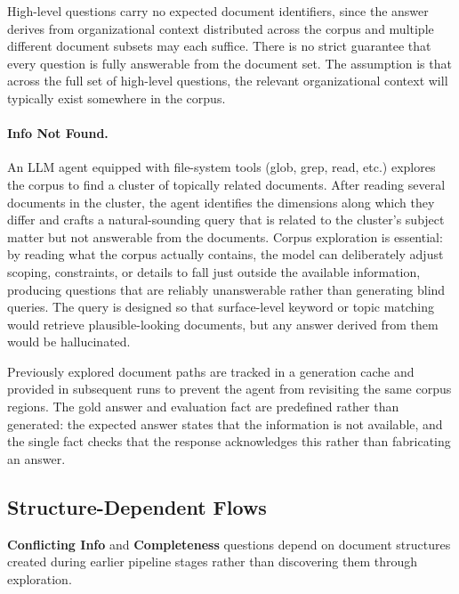 \documentclass{article}
\begin{document}
High-level questions carry no expected document identifiers, since the answer derives from organizational context distributed across the corpus and multiple different document subsets may each suffice. There is no strict guarantee that every question is fully answerable from the document set. The assumption is that across the full set of high-level questions, the relevant organizational context will typically exist somewhere in the corpus.

\paragraph{Info Not Found.}
An LLM agent equipped with file-system tools (glob, grep, read, etc.) explores the corpus to find a cluster of topically related documents. After reading several documents in the cluster, the agent identifies the dimensions along which they differ and crafts a natural-sounding query that is related to the cluster's subject matter but not answerable from the documents. Corpus exploration is essential: by reading what the corpus actually contains, the model can deliberately adjust scoping, constraints, or details to fall just outside the available information, producing questions that are reliably unanswerable rather than generating blind queries. The query is designed so that surface-level keyword or topic matching would retrieve plausible-looking documents, but any answer derived from them would be hallucinated.

Previously explored document paths are tracked in a generation cache and provided in subsequent runs to prevent the agent from revisiting the same corpus regions. The gold answer and evaluation fact are predefined rather than generated: the expected answer states that the information is not available, and the single fact checks that the response acknowledges this rather than fabricating an answer.

\subsection{Structure-Dependent Flows}
\label{app:structure_dep}

\textbf{Conflicting Info} and \textbf{Completeness} questions depend on document structures created during earlier pipeline stages rather than discovering them through exploration.
\end{document}
